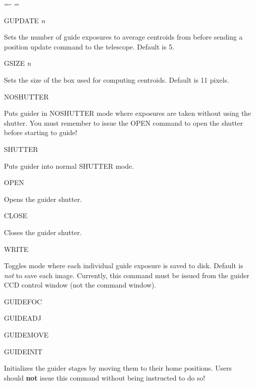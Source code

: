 \documentclass[10pt]{report}
\newenvironment{hanging}{
	\begin{list}{}{
		\labelsep=0pt
		\labelwidth=0pt
		\listparindent=0pt
		\itemindent=-\leftmargini
		\leftmargin=\leftmargini
	}
}{
	\end{list}
}
\begin{document}
\begin{hanging}

\item GUPDATE \textit{n}

Sets the number of guide exposures to average centroids from before sending
a position update command to the telescope. Default is 5.

\item GSIZE \textit{n}

Sets the size of the box used for computing centroids. Default is 11 pixels.

\item NOSHUTTER

Puts guider in NOSHUTTER mode where exposures are taken without using the
shutter. You must remember to issue the OPEN command to open the shutter
before starting to guide! 

\item SHUTTER

Puts guider into normal SHUTTER mode.

\item OPEN

Opens the guider shutter.

\item CLOSE

Closes the guider shutter.

\item WRITE

Toggles mode where each individual guide exposure is saved to disk. Default
is \textit{not} to save each image.
Currently, this command must be issued from the
guider CCD control window (not the command window).

\item GUIDEFOC

\item GUIDEADJ

\item GUIDEMOVE

\item GUIDEINIT

Initializes the guider stages by moving them to their home positions. Users
should \textbf{not} issue this command without being instructed to do so!

\end{hanging}
\end{document}
